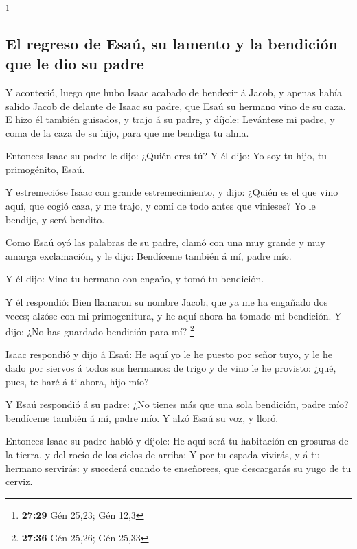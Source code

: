 \footnote{\textbf{27:29} Gén 25,23; Gén 12,3}

\hypertarget{el-regreso-de-esauxfa-su-lamento-y-la-bendiciuxf3n-que-le-dio-su-padre}{%
\subsection{El regreso de Esaú, su lamento y la bendición que le dio su
padre}\label{el-regreso-de-esauxfa-su-lamento-y-la-bendiciuxf3n-que-le-dio-su-padre}}

 Y aconteció, luego que hubo Isaac acabado de bendecir á
Jacob, y apenas había salido Jacob de delante de Isaac su padre, que
Esaú su hermano vino de su caza.  E hizo él también
guisados, y trajo á su padre, y díjole: Levántese mi padre, y coma de la
caza de su hijo, para que me bendiga tu alma.

 Entonces Isaac su padre le dijo: ¿Quién eres tú? Y él
dijo: Yo soy tu hijo, tu primogénito, Esaú.

 Y estremecióse Isaac con grande estremecimiento, y dijo:
¿Quién es el que vino aquí, que cogió caza, y me trajo, y comí de todo
antes que vinieses? Yo le bendije, y será bendito.

 Como Esaú oyó las palabras de su padre, clamó con una muy
grande y muy amarga exclamación, y le dijo: Bendíceme también á mí,
padre mío.

 Y él dijo: Vino tu hermano con engaño, y tomó tu
bendición.

 Y él respondió: Bien llamaron su nombre Jacob, que ya me
ha engañado dos veces; alzóse con mi primogenitura, y he aquí ahora ha
tomado mi bendición. Y dijo: ¿No has guardado bendición para mí?
\footnote{\textbf{27:36} Gén 25,26; Gén 25,33}

 Isaac respondió y dijo á Esaú: He aquí yo le he puesto por
señor tuyo, y le he dado por siervos á todos sus hermanos: de trigo y de
vino le he provisto: ¿qué, pues, te haré á ti ahora, hijo mío?

 Y Esaú respondió á su padre: ¿No tienes más que una sola
bendición, padre mío? bendíceme también á mí, padre mío. Y alzó Esaú su
voz, y lloró.

 Entonces Isaac su padre habló y díjole: He aquí será tu
habitación en grosuras de la tierra, y del rocío de los cielos de
arriba;  Y por tu espada vivirás, y á tu hermano servirás:
y sucederá cuando te enseñorees, que descargarás su yugo de tu cerviz.

